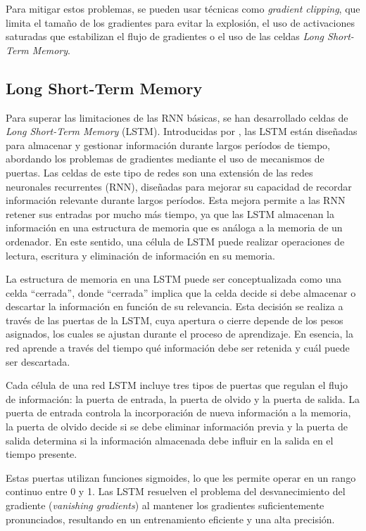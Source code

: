 Para mitigar estos problemas, se pueden usar técnicas como \textit{gradient clipping}, que limita el tamaño de los gradientes para evitar la explosión, el uso de activaciones saturadas que estabilizan el flujo de gradientes o el uso de las celdas \textit{Long Short-Term Memory}.

\subsection*{Long Short-Term Memory}

Para superar las limitaciones de las RNN básicas, se han desarrollado celdas de \textit{Long Short-Term Memory} (LSTM). Introducidas por \cite{hochreiter1997long}, las LSTM están diseñadas para almacenar y gestionar información durante largos períodos de tiempo, abordando los problemas de gradientes mediante el uso de mecanismos de puertas. Las celdas de este tipo de redes son una extensión de las redes neuronales recurrentes (RNN), diseñadas para mejorar su capacidad de recordar información relevante durante largos períodos. Esta mejora permite a las RNN retener sus entradas por mucho más tiempo, ya que las LSTM almacenan la información en una estructura de memoria que es análoga a la memoria de un ordenador. En este sentido, una célula de LSTM puede realizar operaciones de lectura, escritura y eliminación de información en su memoria.

La estructura de memoria en una LSTM puede ser conceptualizada como una celda ``cerrada'', donde ``cerrada'' implica que la celda decide si debe almacenar o descartar la información en función de su relevancia. Esta decisión se realiza a través de las puertas de la LSTM, cuya apertura o cierre depende de los pesos asignados, los cuales se ajustan durante el proceso de aprendizaje. En esencia, la red aprende a través del tiempo qué información debe ser retenida y cuál puede ser descartada.

Cada célula de una red LSTM incluye tres tipos de puertas que regulan el flujo de información: la puerta de entrada, la puerta de olvido y la puerta de salida. La puerta de entrada controla la incorporación de nueva información a la memoria, la puerta de olvido decide si se debe eliminar información previa y la puerta de salida determina si la información almacenada debe influir en la salida en el tiempo presente.

Estas puertas utilizan funciones sigmoides, lo que les permite operar en un rango continuo entre 0 y 1. Las LSTM resuelven el problema del desvanecimiento del gradiente (\textit{vanishing gradients}) al mantener los gradientes suficientemente pronunciados, resultando en un entrenamiento eficiente y una alta precisión.

